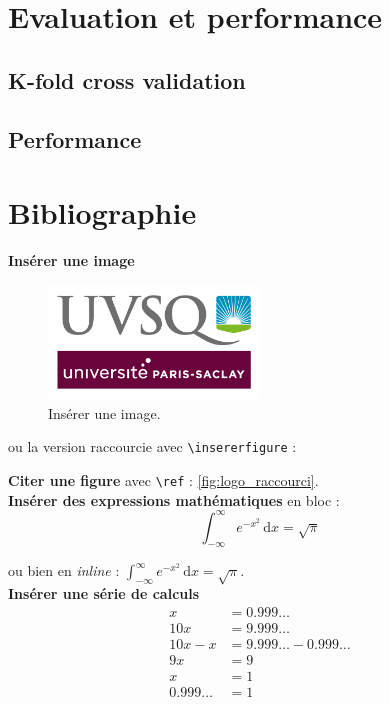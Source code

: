 \documentclass{rapportECL2024}
\begin{document}
\section{Evaluation et performance}
\lipsum[6]
\subsection{K-fold cross validation}
\subsection{Performance}

\section{Bibliographie}

\textbf{Insérer une image}
\begin{figure}[H]
    \centering
    \includegraphics[width=0.5\textwidth]{logos/logo.png}
    \caption{Insérer une image.}
    \label{fig:logo}
\end{figure}

ou la version raccourcie avec \texttt{\textbackslash insererfigure} : 


\textbf{Citer une figure} avec \texttt{\textbackslash ref} : \ref{fig:logo_raccourci}.\\


\textbf{Insérer des expressions mathématiques} en bloc :
\begin{equation*}
    \int_{-\infty}^{\infty} e^{-x^2} \, \text{d}x = \sqrt{\pi}
\end{equation*}

ou bien en \textit{inline} : $\int_{-\infty}^{\infty} e^{-x^2} \, \text{d}x = \sqrt{\pi}$.\\


\textbf{Insérer une série de calculs}
\begin{align*}
    x &= 0.999\ldots \\
    10x &= 9.999\ldots \\
    10x - x &= 9.999\ldots - 0.999\ldots \\
    9x &= 9 \\
    x &= 1 \\
    0.999\ldots &= 1
\end{align*}
\end{document}
